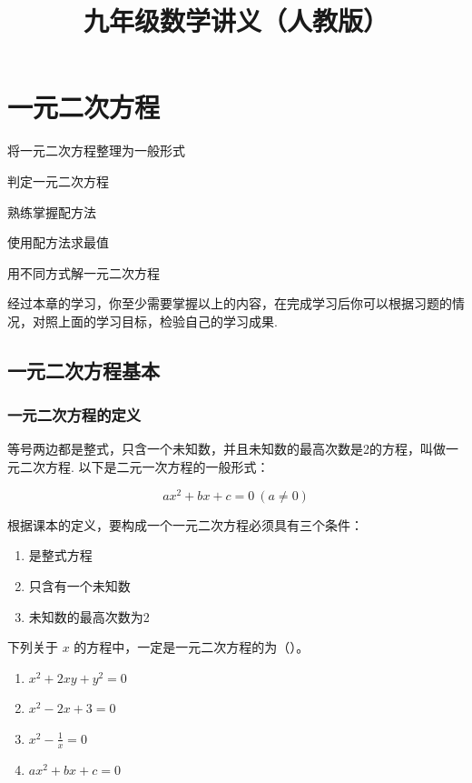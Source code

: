 \documentclass[lang=cn, 10pt, titlestyle=hang]{elegantbook}
\title{九年级数学讲义（人教版）}
\begin{document}
\tableofcontents

\chapter{一元二次方程}



\begin{introduction}[本章学习目标]

\item 将一元二次方程整理为一般形式
\item 判定一元二次方程
\item 熟练掌握配方法
\item 使用配方法求最值
\item 用不同方式解一元二次方程

\end{introduction}

经过本章的学习，你至少需要掌握以上的内容，在完成学习后你可以根据习题的情况，对照上面的学习目标，检验自己的学习成果.

\section{一元二次方程基本}
\subsection{一元二次方程的定义}


\begin{definition}
  
等号两边都是整式，只含一个未知数，并且未知数的最高次数是2的方程，叫做一元二次方程. 以下是二元一次方程的一般形式：

\begin{equation}
    ax^2 + bx + c = 0 \ (a \neq 0)
    \label{general_formula}
\end{equation}

 
\end{definition}



根据课本的定义，要构成一个一元二次方程必须具有三个条件：
\begin{enumerate}
    \item 是整式方程
    \item 只含有一个未知数
    \item 未知数的最高次数为2
\end{enumerate}
\par
\begin{example}
    下列关于 \( x \) 的方程中，一定是一元二次方程的为（{\hspace{3.5em}}）。
    \begin{enumerate}[label=\Alph*.]
        \item \( x^2 + 2xy + y^2 = 0 \)
        \item \( x^2 - 2x + 3 = 0 \)
        \item \( x^2 - \frac{1}{x} = 0 \)
        \item \( ax^2 + bx + c = 0 \)
    \end{enumerate}
\end{example}
\end{document}
